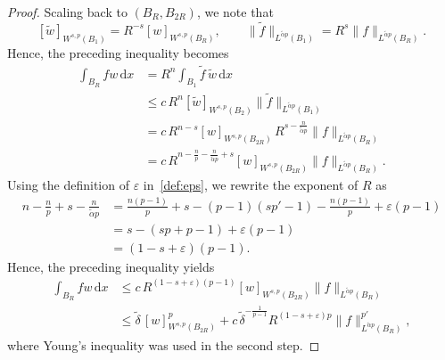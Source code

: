 \documentclass[10pt,letterpaper]{amsart}
\theoremstyle{definition}
\numberwithin{theorem}{section}
\numberwithin{equation}{section}
\newcommand{\1}{\ensuremath{\mathds{1}}}
\newcommand{\dx}{\mathrm{d}x}
\renewcommand{\epsilon}{\varepsilon}
\renewcommand{\epsilon}{\varepsilon}
\numberwithin{equation}{section}
\begin{document}
\begin{proof}
Scaling back to $(B_R,B_{2R})$, we note that
\[
    [\widetilde w]_{W^{s,p}(B_1)} = R^{-s}[w]_{W^{s,p}(B_R)},\qquad 
    \|\widetilde f\|_{L^{\tilde\alpha p}(B_1)} = R^s \|f\|_{L^{\tilde\alpha p}(B_R)}.
\]
Hence, the preceding inequality becomes
\begin{align*}
    \int_{B_R} f w \,\dx
    &= R^n \int_{B_1} \widetilde f\, \widetilde w\,\dx \\
    &\le c\, R^n [\widetilde w]_{W^{s,p}(B_2)} \|\widetilde f\|_{L^{\tilde\alpha p}(B_1)} \\
    &= c\, R^{n-s} [w]_{W^{s,p}(B_{2R})} \, R^{s-\frac{n}{\tilde\alpha p}} \|f\|_{L^{\tilde\alpha p}(B_R)} \\
    &= c\, R^{n - \frac{n}{p} - \frac{n}{\tilde\alpha p} + s} [w]_{W^{s,p}(B_{2R})} \|f\|_{L^{\tilde\alpha p}(B_R)}.
\end{align*}
Using the definition of $\epsilon$ in~\eqref{def:eps}, we rewrite the exponent of $R$ as
\begin{align*}
    n - \frac{n}{p} + s - \frac{n}{\tilde\alpha p} 
    &= \frac{n(p-1)}{p} + s - (p-1)(sp'-1) - \frac{n(p-1)}{p} + \epsilon(p-1) \\
    &= s - (sp+p-1) + \epsilon(p-1) \\
    &= (1-s+\epsilon)(p-1).
\end{align*}
 Hence, the preceding inequality yields
\begin{align*}
    \int_{B_R} f w \,\dx
    &\le 
    c \,R^{(1-s+\epsilon)(p-1)} [w]_{W^{s,p}(B_{2R})} \|f\|_{L^{\tilde\alpha p}(B_R)} \\
    &\le 
    \tilde\delta \,[w]_{W^{s,p}(B_{2R})}^p
    + c\, \tilde\delta^{-\frac{1}{p-1}} R^{(1-s+\epsilon)p} \|f\|_{L^{\tilde\alpha p}(B_R)}^{p'},
\end{align*}
where Young's inequality was used in the second step. 
\end{proof}
\end{document}
